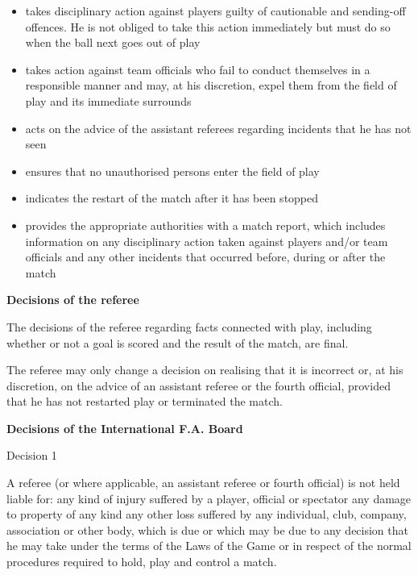 \begin{itemize}
\item takes disciplinary action against players guilty of cautionable and sending-off offences. He is not obliged to take this action immediately but must do so when the ball next goes out of play 
\item takes action against team officials who fail to conduct themselves in a responsible manner and may, at his discretion, expel them from the field of play and its immediate surrounds 
\item acts on the advice of the assistant referees regarding incidents that he has not seen 
\item ensures that no unauthorised persons enter the field of play 
\item indicates the restart of the match after it has been stopped 
\item provides the appropriate authorities with a match report, which includes information on any disciplinary action taken against players and/or team officials and any other incidents that occurred before, during or after
the match 
\end{itemize}

\bigskip

{\bfseries Decisions of the referee}

\headlinebox

The decisions of the referee regarding facts connected with play, including whether or not a goal is scored and the result of the match, are final.

\bigskip

The referee may only change a decision on realising that it is incorrect or, at his discretion, on the advice of an assistant referee or the fourth official, provided that he has not restarted play or terminated the match.


\clearpage
{\bfseries Decisions of the International F.A. Board }

\headlinebox

Decision 1

A referee (or where applicable, an assistant referee or fourth official) is not held liable for: any kind of injury suffered by a player, official or spectator any damage to property of any kind any other loss suffered by any individual, club, company, association or other body, which is due or which may be due to any decision that he
may take under the terms of the Laws of the Game or in respect of the normal procedures required to hold, play and control a match.

\bigskip

